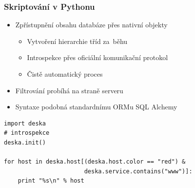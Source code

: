 \documentclass{beamer}
\begin{document}
\begin{frame}[fragile]
\begin{columns}
\begin{column}{.55\paperwidth}
\begin{textblock}{50}
\end{textblock}
\end{column}
\end{columns}
\end{frame}


\begin{frame}[fragile]
\frametitle{Skriptování v Pythonu}
\begin{itemize}
    \item Zpřístupnění obsahu databáze přes nativní objekty
        \begin{itemize}
            \item Vytvoření hierarchie tříd za~běhu
            \item Introspekce přes oficiální komunikační protokol
            \item Čistě automatický proces
        \end{itemize}
    \item Filtrování probíhá na straně serveru
    \item Syntaxe podobná standardnímu ORMu SQL Alchemy
\end{itemize}
\begin{verbatim}
import deska
# introspekce
deska.init()

for host in deska.host[(deska.host.color == "red") &
                       deska.service.contains("www")]:
    print "%s\n" % host
\end{verbatim}
\end{frame}
\end{document}
